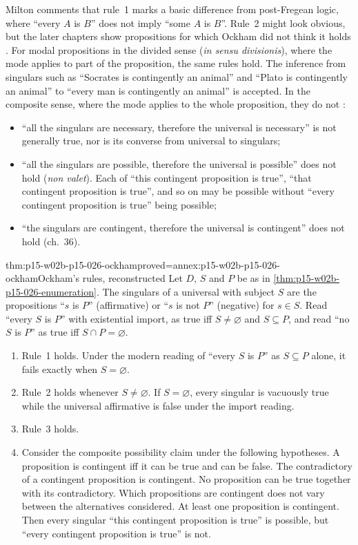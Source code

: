 Milton comments that rule~1 marks a basic difference from post-Fregean
logic, where ``every $A$ is $B$'' does not imply ``some $A$ is $B$''. Rule~2
might look obvious, but the later chapters show propositions for which
Ockham did not think it holds
\cite[pp.~18--19]{Milton2011InductionBeforeHume}. For modal propositions
in the divided sense (\emph{in sensu divisionis}), where the mode applies
to part of the proposition, the same rules hold. The inference from singulars such as ``Socrates is
contingently an animal'' and ``Plato is contingently an animal'' to
``every man is contingently an animal'' is accepted. In the
composite sense, where the mode applies to the whole proposition, they do
not \cite[p.~19, n.~11]{Milton2011InductionBeforeHume}:
\begin{itemize}
\item ``all the singulars are necessary, therefore the universal is
  necessary'' is not generally true, nor is its converse from universal
  to singulars;
\item ``all the singulars are possible, therefore the universal is
  possible'' does not hold (\emph{non valet}). Each of ``this contingent
  proposition is true'', ``that contingent proposition is true'', and so on
  may be possible without ``every contingent proposition is true'' being
  possible;
\item ``the singulars are contingent, therefore the universal is
  contingent'' does not hold (ch.~36).
\end{itemize}

\begin{hblemma}{thm:p15-w02b-p15-026-ockham}{proved=annex:p15-w02b-p15-026-ockham}{Ockham's rules, reconstructed}
Let $D$, $S$ and $P$ be as in \cref{thm:p15-w02b-p15-026-enumeration}.
The singulars of a universal with subject $S$ are the propositions
``$s$ is $P$'' (affirmative) or ``$s$ is not $P$'' (negative) for
$s\in S$. Read ``every $S$ is $P$'' with existential import, as true iff
$S\neq\varnothing$ and $S\subseteq P$, and read ``no $S$ is $P$'' as true
iff $S\cap P=\varnothing$.
\begin{enumerate}
\item Rule~1 holds. Under the modern reading of ``every $S$ is $P$'' as
  $S\subseteq P$ alone, it fails exactly when $S=\varnothing$.
\item Rule~2 holds whenever $S\neq\varnothing$. If $S=\varnothing$, every
  singular is vacuously true while the universal affirmative is false
  under the import reading.
\item Rule~3 holds.
\item Consider the composite possibility claim under the following
  hypotheses. A proposition is contingent iff it can be true and can be
  false. The contradictory of a contingent proposition is contingent. No
  proposition can be true together with its contradictory. Which
  propositions are contingent does not vary between the alternatives
  considered. At least one proposition is contingent. Then every singular
  ``this contingent proposition is true'' is possible, but ``every
  contingent proposition is true'' is not.
\end{enumerate}
\end{hblemma}

